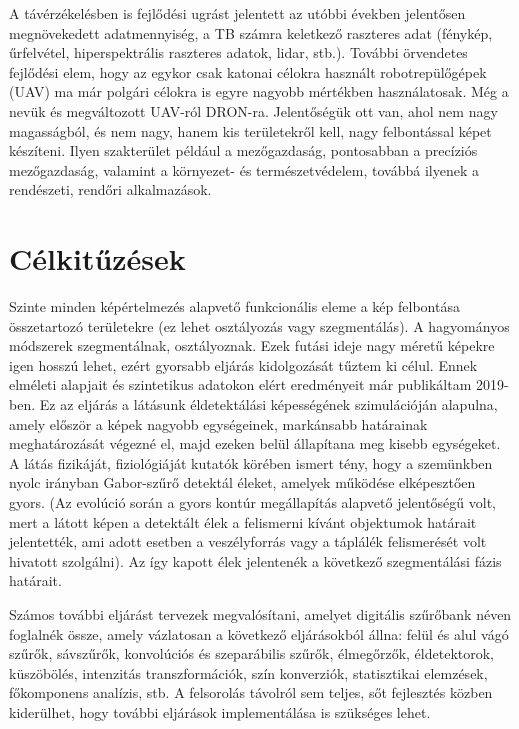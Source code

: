 \documentclass[a4paper,12pt]{article}
\begin{document}
A távérzékelésben is fejlődési ugrást jelentett az utóbbi években jelentősen megnövekedett adatmennyiség, a TB számra keletkező raszteres adat (fénykép, űrfelvétel, hiperspektrális raszteres adatok, lidar, stb.). További örvendetes fejlődési elem, hogy az egykor csak katonai célokra használt robotrepülőgépek (UAV) ma már polgári célokra is egyre nagyobb mértékben használatosak. Még a nevük és megváltozott UAV-ról DRON-ra. Jelentőségük ott van, ahol nem nagy magasságból, és nem nagy, hanem kis területekről kell, nagy felbontással képet készíteni. Ilyen szakterület például a mezőgazdaság, pontosabban a precíziós mezőgazdaság, valamint a környezet- és természetvédelem, továbbá ilyenek a rendészeti, rendőri alkalmazások.

\section{Célkitűzések}

Szinte minden képértelmezés alapvető funkcionális eleme a kép felbontása összetartozó területekre (ez lehet osztályozás vagy szegmentálás). A hagyományos módszerek szegmentálnak, osztályoznak. Ezek futási ideje nagy méretű képekre igen hosszú lehet, ezért gyorsabb eljárás kidolgozását tűztem ki célul. Ennek elméleti alapjait és szintetikus adatokon elért eredményeit már publikáltam 2019-ben. Ez az eljárás a látásunk éldetektálási képességének szimulációján alapulna, amely először a képek nagyobb egységeinek, markánsabb határainak meghatározását végezné el, majd ezeken belül állapítana meg kisebb egységeket. A látás fizikáját, fiziológiáját kutatók körében ismert tény, hogy a szemünkben nyolc irányban Gabor-szűrő detektál éleket, amelyek működése elképesztően gyors. (Az evolúció során a gyors kontúr megállapítás alapvető jelentőségű volt, mert a látott képen a detektált élek a felismerni kívánt objektumok határait jelentették, ami adott esetben a veszélyforrás vagy a táplálék felismerését volt hivatott szolgálni). Az így kapott élek jelentenék a következő szegmentálási fázis határait.

Számos további eljárást tervezek megvalósítani, amelyet digitális szűrőbank néven foglalnék össze, amely vázlatosan a következő eljárásokból állna: felül és alul vágó szűrők, sávszűrők, konvolúciós és szeparábilis szűrők, élmegőrzők, éldetektorok, küszöbölés, intenzitás transzformációk, szín konverziók, statisztikai elemzések, főkomponens analízis, stb. A felsorolás távolról sem teljes, sőt fejlesztés közben kiderülhet, hogy további eljárások implementálása is szükséges lehet.
\end{document}
